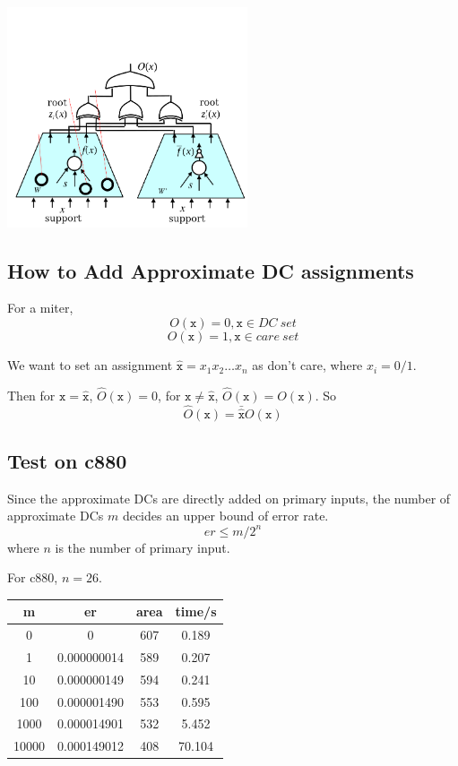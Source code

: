 \documentclass{article}
\begin{document}
\begin{center}
\includegraphics[height=6.5cm]{./miter.png}
\end{center}

\subsection{How to Add Approximate DC assignments}
For a miter,
\[
O(\mathtt x) = 0, \mathtt x \in DC\ set
\]
\[
O(\mathtt x) = 1, \mathtt x \in care\ set
\]

\noindent We want to set an assignment $\hat{\mathtt x} = x_1 x_2 \dots x_n$ as don't care,
where $x_i = 0/1$.

\noindent Then for $\mathtt x = \hat{\mathtt x}$, $\hat{O}(\mathtt x) = 0$,
for $\mathtt x \neq \hat{\mathtt x}$, $\hat{O}(\mathtt x) = O(\mathtt x)$.
So
\[
\hat O(\mathtt x) = \bar{\hat{\mathtt x}} O(\mathtt x)
\]

\subsection{Test on c880}
Since the approximate DCs are directly added on primary inputs,
the number of approximate DCs $m$ decides an upper bound of error rate.
\[
    er \le m / 2^n
\]
where $n$ is the number of primary input.

For c880, $n=26$.

\begin{tabular}{|c|c|c|c|}
    \hline
    m & er & area & time/s\\
    \hline
    0 & 0 &  607 & 0.189\\
    \hline
    1 & 0.000000014 & 589 & 0.207\\
    \hline
    10 & 0.000000149 &594 & 0.241\\
    \hline
    100 & 0.000001490 &553 & 0.595\\
    \hline
    1000 & 0.000014901 &532 & 5.452\\
    \hline
    10000 & 0.000149012 & 408 & 70.104\\
    \hline
\end{tabular}
\end{document}
